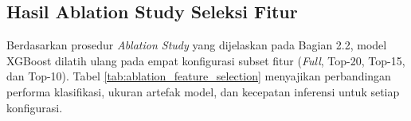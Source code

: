 \documentclass[11pt, a4paper]{article}
\begin{document}
\subsection{Hasil Ablation Study Seleksi Fitur}
\label{sec:hasil_ablation}
Berdasarkan prosedur \textit{Ablation Study} yang dijelaskan pada Bagian 2.2, model XGBoost dilatih ulang pada empat konfigurasi subset fitur (\textit{Full}, Top-20, Top-15, dan Top-10). Tabel \ref{tab:ablation_feature_selection} menyajikan perbandingan performa klasifikasi, ukuran artefak model, dan kecepatan inferensi untuk setiap konfigurasi.

\begin{table}[htbp]
\caption{Hasil Ablation Study Seleksi Fitur: Perbandingan Performa dan Efisiensi}
\label{tab:ablation_feature_selection}
\centering
\vspace{0.2cm}
\end{table}
\end{document}
